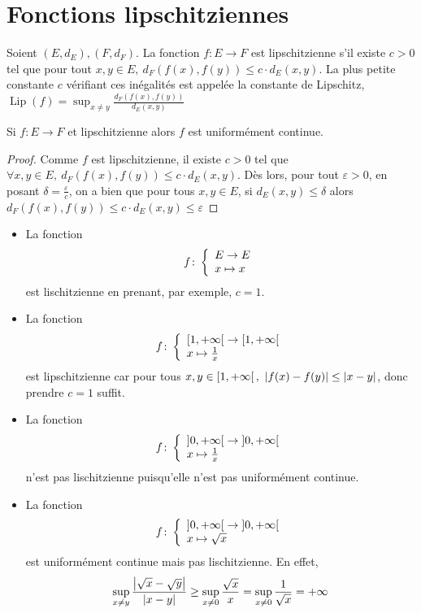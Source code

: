 \section{Fonctions lipschitziennes}
\begin{definition}
    Soient $(E,d_E),(F,d_F)$. La fonction $f:E\to F$ est lipschitzienne s'il existe $c>0$ tel que pour tout $x,y\in E,\ d_F(f(x),f(y))\le c\cdot d_E(x,y)$.
    La plus petite constante $c$ vérifiant ces inégalités est appelée la constante de Lipschitz, $\operatorname{Lip} (f) = \sup_{x\ne y}\frac{d_F(f(x),f(y))}{d_E(x,y)}$
\end{definition}
\begin{proposition}
    Si $f:E\to F$ et lipschitzienne alors $f$ est uniformément continue.
\end{proposition}
\begin{proof}
    Comme $f$ est lipschitzienne, il existe $c>0$ tel que $\forall x,y\in E,\ d_F(f(x),f(y))\le c\cdot d_E(x,y)$. Dès lors, pour tout $\varepsilon>0$, en posant $\delta = \frac{\varepsilon}{c}$, on a bien que pour tous $x,y\in E$, si $d_E(x,y)\le \delta$ alors $d_F(f(x),f(y))\le c \cdot d_E(x,y)\le \varepsilon$
\end{proof}
\begin{exemple}
    \begin{itemize}
        \item La fonction $$f\colon \left\{\begin{array}{l}E\to E \\x\mapsto x\end{array}\right.$$ est lischitzienne en prenant, par exemple, $c=1$.
        \item La fonction $$f\colon \left\{\begin{array}{l}\left[ 1,+\infty\right[\to \left[ 1,+\infty\right[ \\x\mapsto \frac1x\end{array}\right.$$ est lipschitzienne car pour tous $x,y\in \interfo{1,+\infty},\ \abs{f(x)-f(y)}\le \abs{x-y}$, donc prendre $c = 1$ suffit.
        \item La fonction $$f\colon \left\{\begin{array}{l}\left] 0,+\infty\right[\to\left] 0,+\infty\right[ \\x\mapsto\frac{1}{x}\end{array}\right.$$ n'est pas lischitzienne puisqu'elle n'est pas uniformément continue.
        \item La fonction $$f\colon \left\{\begin{array}{l}\left] 0,+\infty\right[\to\left] 0,+\infty\right[ \\x\mapsto\sqrt{ x}\end{array}\right.$$ est uniformément continue mais pas lischitzienne. En effet, $$\sup_{x\ne y}\frac{\left| \sqrt{x}-\sqrt{y} \right|}{\left| x-y \right|}\ge \sup_{x\ne 0} \frac{\sqrt{x}}{x} = \sup_{x\ne 0} \frac{1}{\sqrt{x}} = +\infty$$
    \end{itemize}
\end{exemple}